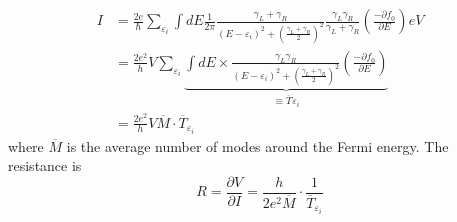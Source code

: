 \begin{align}
    I& = \frac{2e}{\hbar}\sum_{\varepsilon_{i}}{\int dE \frac{1}{2\pi}\frac{\gamma_{L}+\gamma_{R}}{\left(E-\varepsilon_{i}\right)^{2}+\left(\frac{\gamma_{L}+\gamma_{R}}{2}\right)^{2}} \frac{\gamma_{L}\gamma_{R}}{\gamma_{L}+\gamma_{R}} \left(\frac{-\partial f_{0}}{\partial E}\right)eV}\nonumber\\
    &= \frac{2e^2}{h}V\sum_{\varepsilon_{i}}{\underbrace{\int dE\times \frac{\gamma_{L}\gamma_{R}}{\left(E-\varepsilon_{i}\right)^{2}+\left(\frac{\gamma_{L}+\gamma_{R}}{2}\right)^{2}} \left(\frac{-\partial f_{0}}{\partial E}\right)}_{\equiv \overline{T}_{}\varepsilon_{i}}}\nonumber\\
    &= \frac{2e^{2}}{h}V\overline{M}\cdot\overline{T}_{\varepsilon_{i}}
\end{align} where $\overline{M}$ is the average number of modes around the Fermi energy. The resistance is \begin{equation}
    R = \frac{\partial V}{\partial I} = \frac{h}{2e^{2}\overline{M}}\cdot\frac{1}{\overline{T}_{\varepsilon_{i}}}
\end{equation} 
